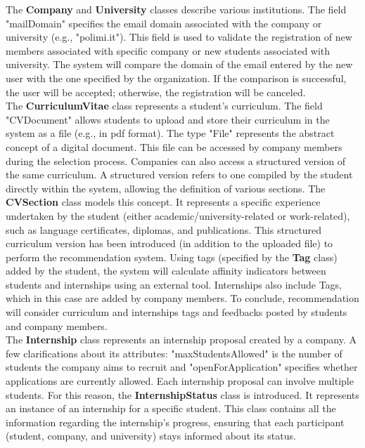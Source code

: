The \textbf{Company} and \textbf{University} classes describe various institutions.
The field "mailDomain" specifies the email domain associated with the company or university (e.g., "polimi.it").
This field is used to validate the registration of new members associated with specific company or new students associated with university.
The system will compare the domain of the email entered by the new user with the one specified by the organization. If the comparison is successful, the user will be accepted; otherwise, the registration will be canceled.\\

The \textbf{CurriculumVitae} class represents a student's curriculum.
The field "CVDocument" allows students to upload and store their curriculum in the system as a file (e.g., in pdf format).
The type "File" represents the abstract concept of a digital document.
This file can be accessed by company members during the selection process. Companies can also access a structured version of the same curriculum.
A structured version refers to one compiled by the student directly within the system, allowing the definition of various sections.
The \textbf{CVSection} class models this concept. It represents a specific experience undertaken by the student (either academic/university-related or work-related), such as language certificates, diplomas, and publications.
This structured curriculum version has been introduced (in addition to the uploaded file) to perform the recommendation system.
Using tags (specified by the \textbf{Tag} class) added by the student, the system will calculate affinity indicators between students and internships using an external tool.
Internships also include Tags, which in this case are added by company members. To conclude, recommendation will consider curriculum and internships tags and feedbacks posted by students and company members.\\

The \textbf{Internship} class represents an internship proposal created by a company.
A few clarifications about its attributes: "maxStudentsAllowed" is the number of students the company aims to recruit
and "openForApplication" specifies whether applications are currently allowed. Each internship proposal can involve multiple students.
For this reason, the \textbf{InternshipStatus} class is introduced. It represents an instance of an internship for a specific student.
This class contains all the information regarding the internship's progress, ensuring that each participant (student, company, and university) stays informed about its status.\\

